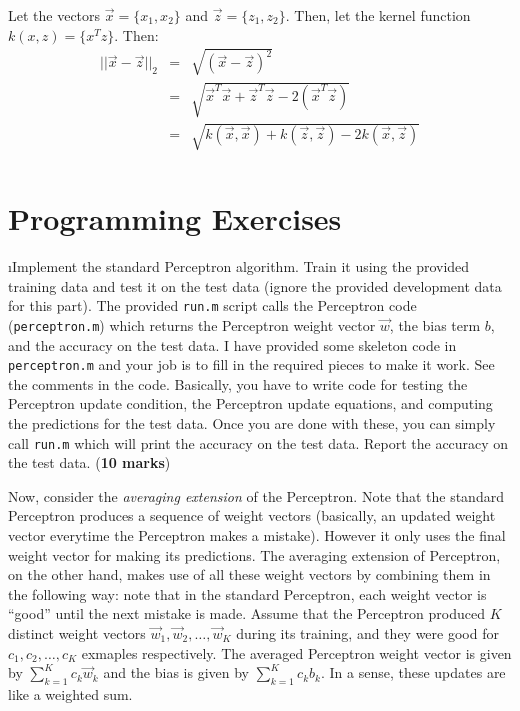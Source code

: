 \documentclass[fleqn]{article}
\begin{document}
\begin{solution}
Let the vectors $\vec{x} = \{x_1, x_2\}$ and $\vec{z} = \{z_1, z_2\}$. Then, let the kernel function $k(x, z) = \{x^Tz\}$. Then:
\begin{eqnarray*}
||\vec{x} - \vec{z}||_2 & = & \sqrt{(\vec{x} - \vec{z})^2} \\
& = & \sqrt{\vec{x}^T\vec{x} + \vec{z}^T\vec{z} - 2 (\vec{x}^T \vec{z})} \\
& = & \sqrt{k(\vec{x}, \vec{x}) + k(\vec{z}, \vec{z}) - 2 k(\vec{x}, \vec{z})} \\
\end{eqnarray*}
\end{solution}

\ene

\section{Programming Exercises}

\bee

\i Implement the standard Perceptron algorithm. Train it using
the provided training data and test it on the test data (ignore
the provided development data for this part). The provided
\texttt{run.m} script calls the Perceptron code (\texttt{perceptron.m}) 
which returns the Perceptron weight vector $\vec{w}$, the bias term 
$b$, and the accuracy on the test data. I have provided some skeleton code 
in \texttt{perceptron.m} and your job is to fill in the required 
pieces to make it work. See the comments in the code. Basically, you 
have to write code for testing the Perceptron update condition, the 
Perceptron update equations, and computing the predictions for the test 
data. Once you are done with these, you can simply call \texttt{run.m} 
which will print the accuracy on the test data. Report the accuracy on
the test data. (\textbf{10 marks})

Now, consider the \textit{averaging extension} of the Perceptron. Note that
the standard Perceptron produces a sequence of weight vectors
(basically, an updated weight vector everytime the Perceptron makes a mistake).
However it only uses the final weight vector for making its predictions.
The averaging extension of Perceptron, on the other hand, makes use of all these
weight vectors by combining them in the following way:
note that in the standard Perceptron, each weight vector is ``good'' until 
the next mistake is made. Assume that the Perceptron produced $K$ distinct 
weight vectors $\vec{w}_1,\vec{w}_2,\ldots,\vec{w}_K$ during its training, 
and they were good for $c_1,c_2,\ldots, c_K$ exmaples respectively. The 
averaged Perceptron weight vector is given by $\sum_{k=1}^K c_k \vec{w}_k$ 
and the bias is given by $\sum_{k=1}^K c_k b_k$. In a sense, these updates
are like a weighted sum.
\end{document}
